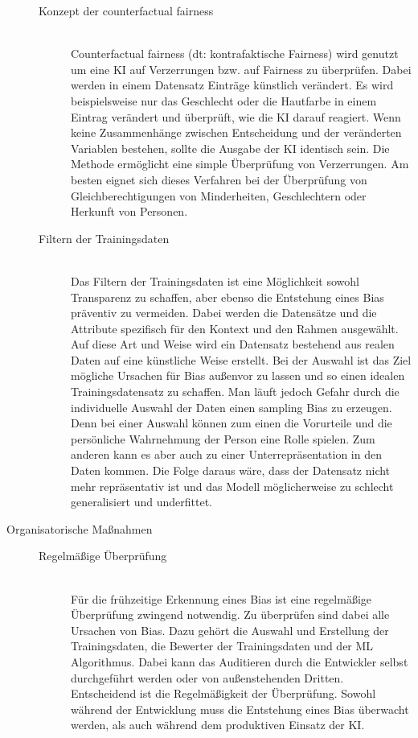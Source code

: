 \begin{onehalfspace}
\begin{description}
\begin{description}
                \item[Konzept der \glqq{}counterfactual fairness\grqq{}] \hfill \\
                \glqq{}Counterfactual fairness\grqq{} (\ac*{dt}: kontrafaktische Fairness) wird genutzt um eine \ac*{KI} auf Verzerrungen bzw. auf Fairness zu überprüfen. Dabei werden in einem Datensatz Einträge künstlich verändert. Es wird beispielsweise nur das Geschlecht oder die Hautfarbe in einem Eintrag verändert und überprüft, wie die \ac*{KI} darauf reagiert. Wenn keine Zusammenhänge zwischen Entscheidung und der veränderten Variablen bestehen, sollte die Ausgabe der \ac*{KI} identisch sein. Die Methode ermöglicht eine simple Überprüfung von Verzerrungen. Am besten eignet sich dieses Verfahren bei der Überprüfung von Gleichberechtigungen von Minderheiten, Geschlechtern oder Herkunft von Personen.\cite{hagendorff2019maschinelles}

                \item[Filtern der Trainingsdaten] \hfill \\
                Das Filtern der Trainingsdaten ist eine Möglichkeit sowohl Transparenz zu schaffen, aber ebenso die Entstehung eines Bias präventiv zu vermeiden. Dabei werden die Datensätze und die Attribute spezifisch für den Kontext und den Rahmen ausgewählt. Auf diese Art und Weise wird ein Datensatz bestehend aus realen Daten auf eine künstliche Weise erstellt. Bei der Auswahl ist das Ziel mögliche Ursachen für Bias außenvor zu lassen und so einen idealen Trainingsdatensatz zu schaffen.
                Man läuft jedoch Gefahr durch die individuelle Auswahl der Daten einen sampling Bias zu erzeugen. Denn bei einer Auswahl können zum einen die Vorurteile und die persönliche Wahrnehmung der Person eine Rolle spielen. Zum anderen kann es aber auch zu einer Unterrepräsentation in den Daten kommen. Die Folge daraus wäre, dass der Datensatz nicht mehr repräsentativ ist und das Modell möglicherweise zu schlecht generalisiert und underfittet.\cite{Google}\cite{ntoutsi2020bias}

            \end{description}

            \item[Organisatorische Maßnahmen] \hfill
            \begin{description}
                \item [Regelmäßige Überprüfung] \hfill \\
                Für die frühzeitige Erkennung eines Bias ist eine regelmäßige Überprüfung zwingend notwendig. Zu überprüfen sind dabei alle Ursachen von Bias. Dazu gehört die Auswahl und Erstellung der Trainingsdaten, die Bewerter der Trainingsdaten und der \ac{ML} Algorithmus. 
                Dabei kann das Auditieren durch die Entwickler selbst durchgeführt werden oder von außenstehenden Dritten. Entscheidend ist die Regelmäßigkeit der Überprüfung. Sowohl während der Entwicklung muss die Entstehung eines Bias überwacht werden, als auch während dem produktiven Einsatz der \ac{KI}.\cite{Drew2019}\cite{hagendorff2019maschinelles}\cite{Dilmegani2020}\cite{Google}


\end{description}
\end{description}
\end{onehalfspace}
